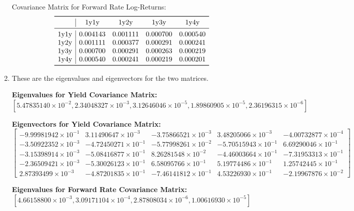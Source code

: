 \documentclass{article}
\begin{document}
\begin{enumerate}
        \centering Covariance Matrix for Forward Rate Log-Returns:
        \[
        \begin{array}{r|cccc}
        \toprule
         & \text{1y1y} & \text{1y2y} & \text{1y3y} & \text{1y4y} \\
        \midrule
        \text{1y1y} & 0.004143 & 0.001111 & 0.000700 & 0.000540 \\
        \text{1y2y} & 0.001111 & 0.000377 & 0.000291 & 0.000241 \\
        \text{1y3y} & 0.000700 & 0.000291 & 0.000263 & 0.000219 \\
        \text{1y4y} & 0.000540 & 0.000241 & 0.000219 & 0.000201 \\
        \bottomrule
        \end{array}
        \]
    
        \raggedright
        \item These are the eigenvalues and eigenvectors for the two matrices.
        
        \textbf{Eigenvalues for Yield Covariance Matrix:}
        \[
        [5.47835140 \times 10^{-2}, 2.34048327 \times 10^{-3}, 3.12646046 \times 10^{-5}, 1.89860905 \times 10^{-5}, 2.36196315 \times 10^{-6}]
        \]
        
        \textbf{Eigenvectors for Yield Covariance Matrix:}
        \[
        \begin{bmatrix}
        -9.99981942 \times 10^{-1} & 3.11490647 \times 10^{-3} & -3.75866521 \times 10^{-3} & 3.48205066 \times 10^{-3} & -4.00732877 \times 10^{-4} \\
        -3.50922352 \times 10^{-3} & -4.72450271 \times 10^{-1} & -5.77998261 \times 10^{-2} & -5.70515943 \times 10^{-1} & 6.69290046 \times 10^{-1} \\
        -3.15398914 \times 10^{-3} & -5.08416877 \times 10^{-1} & 8.26281548 \times 10^{-2} & -4.46003664 \times 10^{-1} & -7.31953313 \times 10^{-1} \\
        -2.36509421 \times 10^{-3} & -5.30026123 \times 10^{-1} & 6.58095766 \times 10^{-1} & 5.19774486 \times 10^{-1} & 1.25742445 \times 10^{-1} \\
        2.87393499 \times 10^{-3} & -4.87201835 \times 10^{-1} & -7.46141812 \times 10^{-1} & 4.53226930 \times 10^{-1} & -2.19967876 \times 10^{-2}
        \end{bmatrix}
        \]
        
        \textbf{Eigenvalues for Forward Rate Covariance Matrix:}
        \[
        [4.66158800 \times 10^{-3}, 3.09171104 \times 10^{-4}, 2.87808034 \times 10^{-6}, 1.00616930 \times 10^{-5}]
        \]
        

\end{enumerate}
\end{document}
